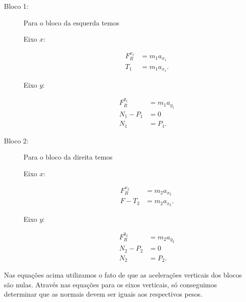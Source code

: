 \begin{description}
    \item[Bloco 1:] Para o bloco da esquerda temos
        \begin{description}
            \item[Eixo $x$:]
                \begin{align}
                    F_R^{x_1} &= m_1 a_{x_1} \\
                    T_1 &= m_1 a_{x_1}. \label{Eq:BlocosAcelLateralX1}
                \end{align}
            \item[Eixo $y$:]
                \begin{align}
                    F_R^{y_1} &= m_1 a_{y_1} \\
                    N_1 - P_1 &= 0 \\
                    N_1 &= P_1.
                \end{align}
        \end{description}
    \item[Bloco 2:] Para o bloco da direita temos
        \begin{description}
            \item[Eixo $x$:]
                \begin{align}
                    F_R^{x_2} &= m_2 a_{x_2} \\
                    F - T_2 &= m_2 a_{x_2}. \label{Eq:BlocosAcelLateralX2}
                \end{align}
            \item[Eixo $y$:]
                \begin{align}
                    F_R^{y_2} &= m_2 a_{y_2} \\
                    N_2 - P_2 &= 0 \\
                    N_2 &= P_2.
                \end{align}
        \end{description}
\end{description}

\noindent{}Nas equações acima utilizamos o fato de que as acelerações verticais dos blocos são nulas. Através nas equações para os eixos verticais, só conseguimos determinar que as normais devem ser iguais aos respectivos pesos.


